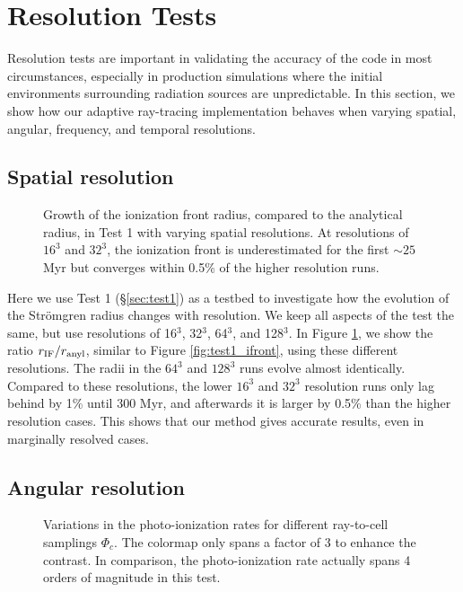 \documentclass[apj,onecolumn]{emulateapj}
\begin{document}
\section{Resolution Tests}

Resolution tests are important in validating the accuracy of the code
in most circumstances, especially in production simulations where the
initial environments surrounding radiation sources are unpredictable.
In this section, we show how our adaptive ray-tracing implementation
behaves when varying spatial, angular, frequency, and temporal
resolutions.

\subsection{Spatial resolution}

\begin{figure}[t]
  \caption{\label{fig:dx_dep1} Growth of the ionization front radius,
    compared to the analytical radius, in Test 1 with varying spatial
    resolutions.  At resolutions of $16^3$ and $32^3$, the ionization
    front is underestimated for the first $\sim25$ Myr but converges
    within 0.5\% of the higher resolution runs.}
\end{figure}

Here we use Test 1 (\S\ref{sec:test1}) as a testbed to investigate how
the evolution of the Str\"{o}mgren radius changes with resolution.  We
keep all aspects of the test the same, but use resolutions of 16$^3$,
32$^3$, 64$^3$, and 128$^3$.  In Figure \ref{fig:dx_dep1}, we show the
ratio $r_{\rm IF}/r_{\rm anyl}$, similar to Figure
\ref{fig:test1_ifront}, using these different resolutions.  The radii
in the $64^3$ and $128^3$ runs evolve almost identically.  Compared to
these resolutions, the lower $16^3$ and $32^3$ resolution runs only
lag behind by 1\% until 300 Myr, and afterwards it is larger by 0.5\%
than the higher resolution cases.  This shows that our method gives
accurate results, even in marginally resolved cases.

\subsection{Angular resolution}
\label{sec:ang_dep}

\begin{figure}[t]
  \caption{\label{fig:ang_dep1} Variations in the photo-ionization
    rates for different ray-to-cell samplings $\Phi_c$.  The colormap
    only spans a factor of 3 to enhance the contrast.  In comparison,
    the photo-ionization rate actually spans 4 orders of magnitude in
    this test.}
\end{figure}
\end{document}
